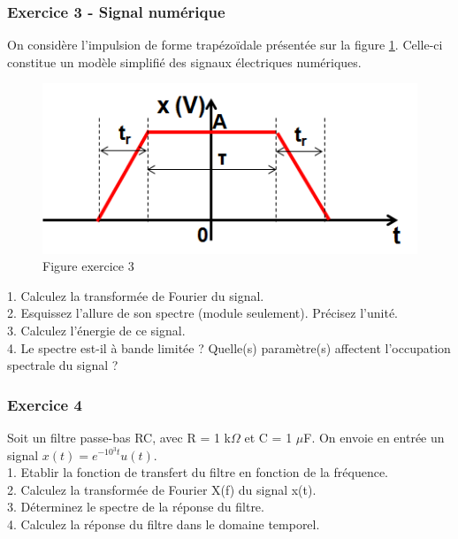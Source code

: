 	
	\subsubsection{Exercice 3 - Signal numérique}
	On considère l'impulsion de forme trapézoïdale présentée sur la figure \ref{Fig:Exo_TF_3}. Celle-ci constitue un modèle simplifié des signaux électriques numériques.
	
	\begin{figure}[h!]
		\centering
		\includegraphics[scale=0.6]{images/exo_3_TF.png}
		\caption{Figure exercice 3}	
		\label{Fig:Exo_TF_3} 
	\end{figure}

	1. Calculez la transformée de Fourier du signal.\\
	
	2. Esquissez l'allure de son spectre (module seulement). Précisez l'unité.\\
	
	3. Calculez l'énergie de ce signal.\\
	
	4. Le spectre est-il à bande limitée ? Quelle(s) paramètre(s) affectent l'occupation spectrale du signal ?\\
	

	
	\subsubsection{Exercice 4}
	Soit un filtre passe-bas RC, avec R = 1 k$\Omega$ et C = 1 $\mu$F. On envoie en entrée un signal $x(t)=e^{-10^{3}t}u(t)$.\\
	
	1. Etablir la fonction de transfert du filtre en fonction de la fréquence.\\
	
	2. Calculez la transformée de Fourier X(f) du signal x(t).\\
	
	3. Déterminez le spectre de la réponse du filtre.\\
	
	4. Calculez la réponse du filtre dans le domaine temporel.\\